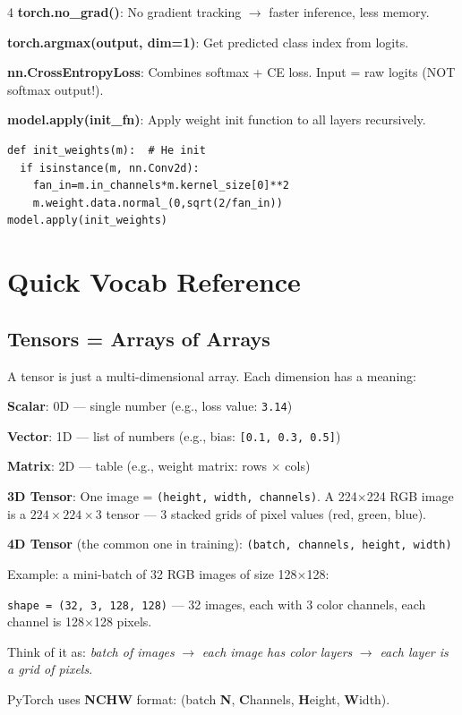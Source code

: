 \documentclass[6pt,landscape,a4paper]{extarticle}
\begin{document}
\begin{multicols}{4}
\textbf{torch.no\_grad()}: No gradient tracking $\to$ faster inference, less memory.

\textbf{torch.argmax(output, dim=1)}: Get predicted class index from logits.

\textbf{nn.CrossEntropyLoss}: Combines softmax + CE loss. Input = raw logits (NOT softmax output!).

\textbf{model.apply(init\_fn)}: Apply weight init function to all layers recursively.
\begin{lstlisting}
def init_weights(m):  # He init
  if isinstance(m, nn.Conv2d):
    fan_in=m.in_channels*m.kernel_size[0]**2
    m.weight.data.normal_(0,sqrt(2/fan_in))
model.apply(init_weights)
\end{lstlisting}

\section{Quick Vocab Reference}

\subsection{Tensors = Arrays of Arrays}
A tensor is just a multi-dimensional array. Each dimension has a meaning:

\textbf{Scalar}: 0D --- single number (e.g., loss value: \texttt{3.14})

\textbf{Vector}: 1D --- list of numbers (e.g., bias: \texttt{[0.1, 0.3, 0.5]})

\textbf{Matrix}: 2D --- table (e.g., weight matrix: rows $\times$ cols)

\textbf{3D Tensor}: One image = \texttt{(height, width, channels)}. A 224$\times$224 RGB image is a $224 \times 224 \times 3$ tensor --- 3 stacked grids of pixel values (red, green, blue).

\textbf{4D Tensor} (the common one in training): \texttt{(batch, channels, height, width)}

Example: a mini-batch of 32 RGB images of size 128$\times$128:

\texttt{shape = (32, 3, 128, 128)} --- 32 images, each with 3 color channels, each channel is 128$\times$128 pixels.

Think of it as: \textit{batch of images} $\to$ \textit{each image has color layers} $\to$ \textit{each layer is a grid of pixels}.

PyTorch uses \textbf{NCHW} format: (batch \textbf{N}, \textbf{C}hannels, \textbf{H}eight, \textbf{W}idth).


\end{multicols}
\end{document}
